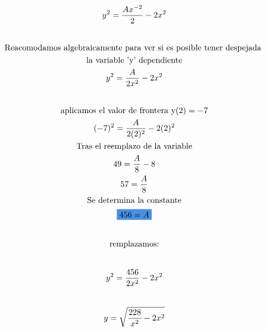 \documentclass{article}
\begin{document}
\begin{gather*}
y^{2}=\frac{Ax^{-2}}{2}-2x^{2} \\
\vspace{0.5em} \\
\text{Reacomodamos algebraicamente para ver si es posible tener despejada } \\
\text{la variable 'y' dependiente} \\
y^{2}=\frac{A}{2x^{2}}-2x^{2} \\
\vspace{0.5em} \\
\text{aplicamos el valor de frontera y}(2)=-7 \\
(-7)^{2}=\frac{A}{2(2)^{2}}-2(2)^{2} \\
\text{Tras el reemplazo de la variable} \\
49=\frac{A}{8}-8 \\
57=\frac{A}{8} \\
\text{Se determina la constante} \\
\text{\colorbox[RGB]{74,144,226}{$456=A$}} \\
\vspace{0.5em} \\
\text{remplazamos:} \\
\vspace{0.5em} \\
y^{2}=\frac{456}{2x^{2}}-2x^{2} \\
\vspace{0.5em} \\
y=\sqrt{\frac{228}{x^{2}}-2x^{2}}   
\end{gather*}
\end{document}
